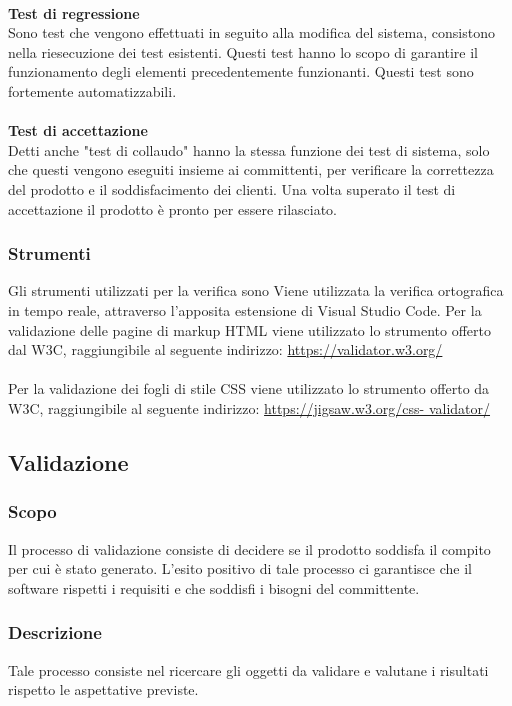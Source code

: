             \\
            \textbf{Test di regressione}\\
            Sono test che vengono effettuati in seguito alla modifica del sistema, consistono nella riesecuzione dei test esistenti. Questi test hanno lo scopo di garantire il funzionamento degli elementi precedentemente funzionanti. Questi test sono fortemente automatizzabili.\\\\
            \textbf{Test di accettazione}\\
            Detti anche "test di collaudo" hanno la stessa funzione dei test di sistema, solo che questi vengono eseguiti insieme ai committenti, per verificare la correttezza del prodotto e il soddisfacimento dei clienti. Una volta superato il test di accettazione il prodotto è pronto per essere rilasciato.
            \subsubsection{Strumenti}
            Gli strumenti utilizzati per la verifica sono
            Viene utilizzata la verifica ortografica in tempo reale, attraverso l'apposita estensione di Visual Studio Code. 
            Per la validazione delle pagine di markup HTML viene utilizzato lo strumento offerto dal W3C, raggiungibile al seguente indirizzo:
            \href{https://validator.w3.org/}{https://validator.w3.org/}\\\\
            Per la validazione dei fogli di stile CSS viene utilizzato lo strumento offerto da W3C, raggiungibile al seguente indirizzo:
            \href{https://jigsaw.w3.org/css- validator/}{https://jigsaw.w3.org/css- validator/}           
    \subsection{Validazione}
        \subsubsection{Scopo}
        Il processo di validazione consiste di decidere se il prodotto soddisfa il compito per cui è stato generato. L'esito positivo di tale processo ci garantisce che il software rispetti i requisiti e che soddisfi i bisogni del committente.
        \subsubsection{Descrizione}
        Tale processo consiste nel ricercare gli oggetti da validare e valutane i risultati rispetto le aspettative previste.
